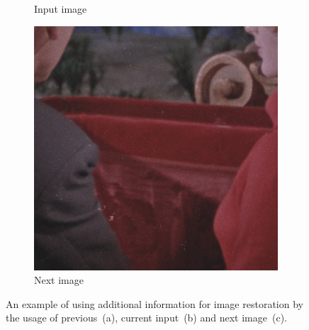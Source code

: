 \begin{figure}[H]
\begin{subfigure}{.3\textwidth}
		\caption[figure]{Input image}
		\label{fig:flow_flow2}
	\end{subfigure}
	\begin{subfigure}{.3\textwidth}
		\centering
		\includegraphics[width=\linewidth]{introduction/next.png}
		\caption[figure]{Next image}
		\label{fig:flow_flow3}
	\end{subfigure}
	\caption[figure]{An example of using additional information for image restoration by the usage of previous~(a), current input~(b) and next image~(c).}
	\label{fig:flow_input}
\end{figure}
	
